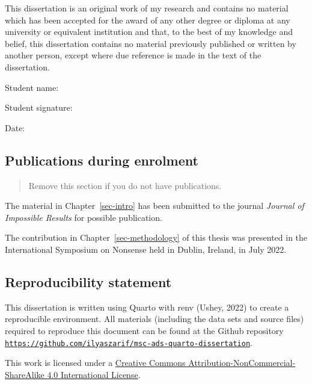 \documentclass{uniexeterthesis}
\begin{document}

This dissertation is an original work of my research and contains no material
which has been accepted for the award of any other degree or diploma at
any university or equivalent institution and that, to the best of my
knowledge and belief, this dissertation contains no material previously
published or written by another person, except where due reference is
made in the text of the dissertation.

Student name:

Student signature:

Date:

\hypertarget{publications-during-enrolment}{%
\subsection*{Publications during
enrolment}\label{publications-during-enrolment}}

\begin{quote}
Remove this section if you do not have publications.
\end{quote}

The material in Chapter~\ref{sec-intro} has been submitted to the
journal \emph{Journal of Impossible Results} for possible publication.

The contribution in Chapter~\ref{sec-methodology} of this thesis was
presented in the International Symposium on Nonsense held in Dublin,
Ireland, in July 2022.

\hypertarget{reproducibility-statement}{%
\subsection*{Reproducibility
statement}\label{reproducibility-statement}}

This dissertation is written using Quarto with renv (Ushey, 2022) to create a
reproducible environment. All materials (including the data sets and
source files) required to reproduce this document can be found at the
Github repository
\href{https://github.com/ilyaszarif/msc-ads-quarto-dissertation}{\texttt{https://github.com/ilyaszarif/msc-ads-quarto-dissertation}}.

This work is licensed under a
\href{http://creativecommons.org/licenses/by-nc-sa/4.0/}{Creative
Commons Attribution-NonCommercial-ShareAlike 4.0 International License}.
\end{document}
